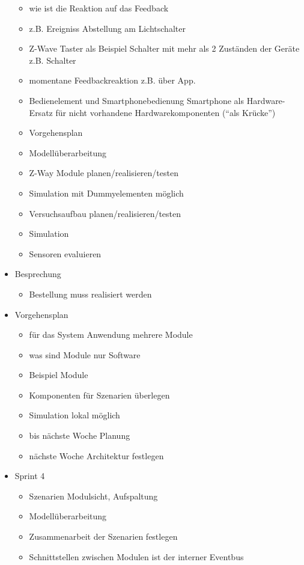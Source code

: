 \begin{itemize}
\begin{itemize}
		\item wie ist die Reaktion auf das Feedback
		\item z.B. Ereigniss Abstellung am Lichtschalter
		\item Z-Wave Taster als Beispiel Schalter mit mehr als 2 Zuständen der Geräte z.B. Schalter
		\item momentane Feedbackreaktion z.B. über App.
		\item Bedienelement und Smartphonebedienung \textrightarrow{ }Smartphone als Hardware-Ersatz für nicht vorhandene Hardwarekomponenten ("`als Krücke"')
		\item Vorgehensplan
		\item Modellüberarbeitung
		\item Z-Way Module planen/realisieren/testen
		\item Simulation mit Dummyelementen möglich
		\item Versuchsaufbau planen/realisieren/testen
		\item Simulation
		\item Sensoren evaluieren
	\end{itemize}
	\item Besprechung
	\begin{itemize}
		\item Bestellung muss realisiert werden
	\end{itemize}
	\item Vorgehensplan
	\begin{itemize}
		\item für das System Anwendung mehrere Module
		\item was sind Module \textrightarrow{ }nur Software
		\item Beispiel Module
		\item Komponenten für Szenarien überlegen
		\item Simulation lokal möglich
		\item bis nächste Woche Planung
		\item nächste Woche Architektur festlegen
	\end{itemize}
	\item Sprint 4
	\begin{itemize}
		\item Szenarien Modulsicht, Aufspaltung
		\item Modellüberarbeitung
		\item Zusammenarbeit der Szenarien festlegen
		\item Schnittstellen zwischen Modulen ist der interner Eventbus

\end{itemize}
\end{itemize}
